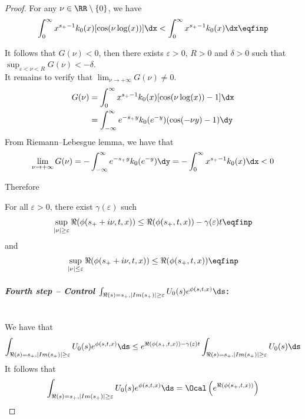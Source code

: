 \begin{proof}
For any $\nu \in \RR \setminus \{0\}$, we have
\begin{equation}
 \int_0^\infty x^{s_+ - 1}k_0(x) [\cos(\nu \log(x))] \dx < \int_0^\infty x^{s_+ - 1}k_0(x) \dx
 \eqfinp
\end{equation}

It follows that $G(\nu) < 0$, then there exists $\varepsilon > 0$, $R >0$ and $\delta > 0$
such that $\sup_{\varepsilon < \nu < R}G(\nu) < - \delta$.\\

It remains to verify that $\lim_{\nu \to +\infty}G(\nu) \neq 0$. 
\begin{align*}
    G(\nu) 
    &=  \int_0^\infty x^{s_+ - 1}k_0(x) [\cos(\nu \log(x))- 1] \dx \\
    &=  \int_{-\infty}^\infty e^{-s_+ y}k_0(e^{-y})(\cos(-\nu y) - 1 )\dy
    \end{align*}
From Riemann–Lebesgue lemma, we have that 
\begin{equation}
    \lim_{\nu \to +\infty}G(\nu) = - \int_{-\infty}^\infty e^{-s_+ y}k_0(e^{-y})\dy = - \int_{0}^\infty x^{s_+ - 1}k_0(x)\dx < 0
\end{equation}

Therefore
\begin{lemma} For all $\varepsilon > 0$, there exist $\gamma(\varepsilon)$ such
\begin{equation}
    \sup_{|\nu| \geq \varepsilon } \Re(\phi(s_+ + i \nu, t, x)) \leq \Re(\phi(s_+, t, x)) - \gamma(\varepsilon)t
    \eqfinp
\end{equation}
and
\begin{equation}
    \sup_{|\nu| \leq \varepsilon } \Re(\phi(s_+ + i \nu, t, x)) \leq \Re(\phi(s_+, t, x))
    \eqfinp
\end{equation}
\end{lemma}

\medskip
\paragraph{\textit{Fourth step -- Control $\int_{\Re(s) = s_+, |Im(s_+)| \geq \varepsilon} U_0(s) e^{\phi(s, t, x)} \ds$}:}\mbox{}\\
We have that 
\begin{align*}
    \int_{\Re(s) = s_+, |Im(s_+)| \geq \varepsilon} U_0(s) e^{\phi(s, t, x)}
    \ds 
    &\leq  e^{\Re(\phi(s_+, t, x)) - \gamma(\varepsilon)t} \int_{\Re(s) = s_+, |Im(s_+)| \geq \varepsilon} U_0(s) \ds \\
\end{align*}
It follows that 
\begin{align*}
    \int_{\Re(s) = s_+, |Im(s_+)| \geq \varepsilon} U_0(s) e^{\phi(s, t, x)} 
    \ds = \Ocal \left( e^{\Re(\phi(s_+, t, x))} \right)
\end{align*}
\end{proof}


